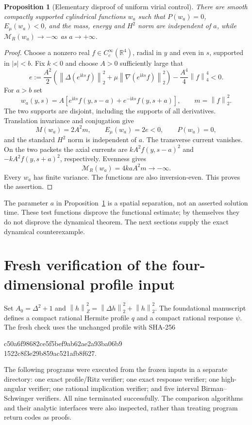 \documentclass[11pt,a4paper]{article}
\newtheorem{proposition}{Proposition}
\newcommand{\R}{\mathbb R}
\newcommand{\ii}{\mathrm i}
\newcommand{\norm}[1]{\left\|#1\right\|}
\begin{document}
\begin{proposition}[Elementary disproof of uniform virial control]\label{packets}
There are smooth compactly supported cylindrical functions $w_a$ such that $P(w_a)=0$, $E_\mu(w_a)<0$, and the mass, energy and $H^2$ norm are independent of $a$, while $\mathcal M_R(w_a)\to-\infty$ as $a\to+\infty$.
\end{proposition}
\begin{proof}
Choose a nonzero real $f\in C_c^\infty(\R^4)$, radial in $y$ and even in $s$, supported in $|s|<b$. Fix $k<0$ and choose $A>0$ sufficiently large that
\[
 e:=\frac{A^2}{2}\left(\norm{\Delta(e^{\ii ks}f)}_2^2+
 \mu\norm{\nabla(e^{\ii ks}f)}_2^2\right)-\frac{A^4}{4}\norm f_4^4<0.
\]
For $a>b$ set
\[
 w_a(y,s)=A\left[e^{\ii ks}f(y,s-a)+e^{-\ii ks}f(y,s+a)\right],
 \qquad m=\norm f_2^2.
\]
The two supports are disjoint, including the supports of all derivatives. Translation invariance and conjugation give
\[
 M(w_a)=2A^2m,\qquad E_\mu(w_a)=2e<0,\qquad P(w_a)=0,
\]
and the standard $H^2$ norm is independent of $a$. The transverse current vanishes. On the two packets the axial currents are $kA^2f(y,s-a)^2$ and $-kA^2f(y,s+a)^2$, respectively. Evenness gives
\begin{equation}\label{packetvirial}
 \mathcal M_R(w_a)=4kaA^2m\longrightarrow-\infty.
\end{equation}
Every $w_a$ has finite variance. The functions are also inversion-even. This proves the assertion.
\end{proof}

The parameter $a$ in Proposition~\ref{packets} is a spatial separation, not an asserted solution time. These test functions disprove the functional estimate; by themselves they do not disprove the dynamical theorem. The next sections supply the exact dynamical counterexample.

\section{Fresh verification of the four-dimensional profile input}
Set $A_0=\Delta^2+1$ and $\norm h_Z^2=\norm{\Delta h}_2^2+\norm h_2^2$. The foundational manuscript \cite{Our} defines a compact rational Hermite profile $q$ and a compact rational response $\psi$. The fresh check uses the unchanged profile with SHA-256
\begin{center}\small\ttfamily
c50a6f98682ce5f5bef9ab62ae2a93ba06b9\\
1522c8f3e29b859ac521afb8f627.
\end{center}
The following programs were executed from the frozen inputs in a separate directory: one exact profile/Ritz verifier; one exact response verifier; one high-angular verifier; one rational implication verifier; and five interval Birman--Schwinger verifiers. All nine terminated successfully. The comparison algorithms and their analytic interfaces were also inspected, rather than treating program return codes as proofs.
\end{document}
